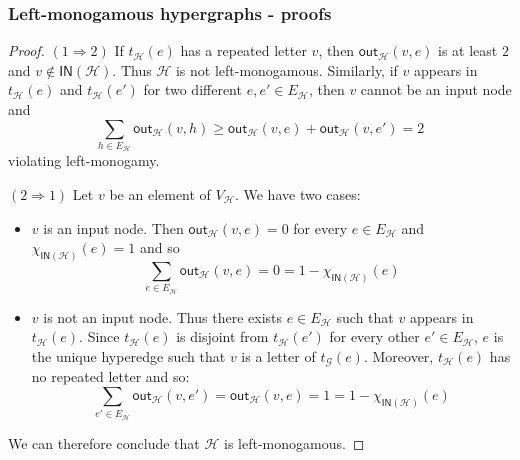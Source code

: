 \documentclass[3p]{elsarticle}
\newcommand{\ino}[1]{\mathsf{IN}({\mathcal{#1}})}
\newcommand{\outd}[1]{\mathsf{out}_{\mathcal{#1}}}
\theoremstyle{remark}
\theoremstyle{definition}
\begin{document}
\subsubsection{Left-monogamous hypergraphs - proofs}

\elem*
\begin{proof}\label{proof:elem}
	$(1\Rightarrow 2)$ If $t_{\mathcal{H}}(e)$ has a repeated letter $v$, then $\outd{H}(v,e)$ is at least $2$ and $v\notin \ino{H}$. Thus $\mathcal{H}$ is not left-monogamous. Similarly, if $v$ appears in $t_{\mathcal{H}}(e)$ and $t_{\mathcal{H}}(e')$ for two different $e, e'\in E_{\mathcal{H}}$, then $v$ cannot be an input node and
	\[\sum_{h\in E_{\mathcal{H}}} \outd{H}(v,h) \geq \outd{H}(v,e) + \outd{H}(v,e')=2 \]
	violating left-monogamy.
	
	\smallskip \noindent 	$(2\Rightarrow 1)$ Let $v$ be an element of $V_{\mathcal{H}}$. We have two cases:
	\begin{itemize}
		\item $v$ is an input node. Then $\outd{H}(v,e)=0$ for every $e\in E_{\mathcal{H}}$ and $\chi_{\ino{H}}(e)=1$ and so
		\[\sum_{e\in E_{\mathcal{H}}} \outd{H}(v,e) = 0 = 1 - \chi_{\ino{H}}(e) \]
		\item $v$ is not an input node. Thus there exists $e\in E_{\mathcal{H}}$ such that $v$ appears in $t_{\mathcal{H}}(e)$. Since $t_{\mathcal{H}}(e)$ is disjoint from $t_{\mathcal{H}}(e')$ for every other $e'\in E_{\mathcal{H}}$, $e$ is the unique hyperedge such that $v$ is a letter of $t_{\mathcal{G}}(e)$. Moreover, $t_{\mathcal{H}}(e)$ has no repeated letter and so:
		\[\sum_{e'\in E_{\mathcal{H}}} \outd{H}(v, e')= \outd{H}(v,e)=1 =1 - \chi_{\ino{H}}(e) \]
	\end{itemize}
	We can therefore conclude that $\mathcal{H}$ is left-monogamous.
\end{proof}
\end{document}
